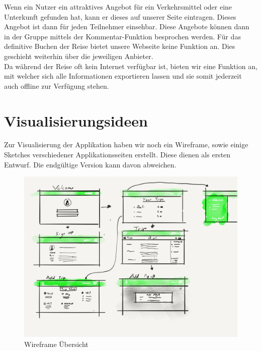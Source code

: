 \documentclass[10pt,a4paper,titlepage,twoside,german,final]{zhawreprt}
\numberwithin{table}{chapter}
\begin{document}
Wenn ein Nutzer ein attraktives Angebot für ein Verkehrsmittel oder eine Unterkunft gefunden hat, kann er dieses auf unserer Seite eintragen. Dieses Angebot ist dann für jeden Teilnehmer einsehbar. Diese Angebote können dann in der Gruppe mittels der Kommentar-Funktion besprochen werden. Für das definitive Buchen der Reise bietet unsere Webseite keine Funktion an. Dies geschieht weiterhin über die jeweiligen Anbieter.\\
Da während der Reise oft kein Internet verfügbar ist, bieten wir eine Funktion an, mit welcher sich alle Informationen exportieren lassen und sie somit jederzeit auch offline zur Verfügung stehen.
\cite{ProjectIdee}
\newpage
\section{Visualisierungsideen}\label{sec:Visualisierungsideen}
Zur Visualisierung der Applikation haben wir noch ein Wireframe, sowie einige Sketches verschiedener Applikationsseiten erstellt. Diese dienen  als ersten Entwurf. Die endgültige Version kann davon abweichen.
\begin{figure}[ht!]
  \includegraphics[width=\linewidth]{images/wireframe.png}
  \caption{Wireframe Übersicht}
  \label{fig:TripPodLogo2}
\end{figure}
\end{document}
